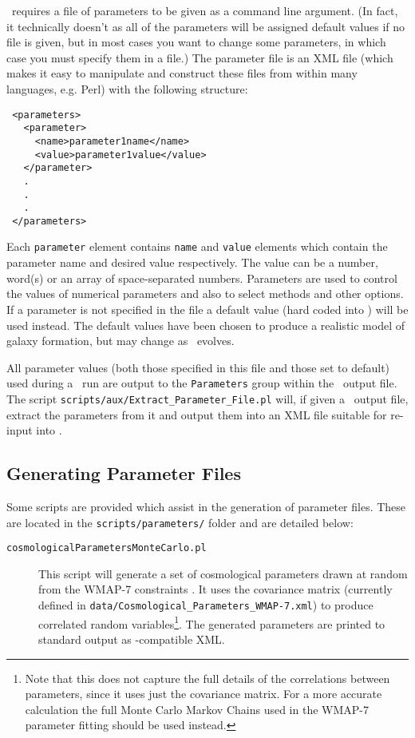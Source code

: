 \glc\ requires a file of parameters to be given as a command line argument. (In fact, it technically doesn't as all of the parameters will be assigned default values if no file is given, but in most cases you want to change some parameters, in which case you must specify them in a file.) The parameter file is an XML file (which makes it easy to manipulate and construct these files from within many languages, e.g. Perl) with the following structure:
\begin{verbatim}
 <parameters>
   <parameter>
     <name>parameter1name</name>
     <value>parameter1value</value>
   </parameter>
   .
   .
   .
 </parameters>
\end{verbatim}
Each {\tt parameter} element contains {\tt name} and {\tt value} elements which contain the parameter name and desired value respectively. The value can be a number, word(s) or an array of space-separated numbers. Parameters are used to control the values of numerical parameters and also to select methods and other options. If a parameter is not specified in the file a default value (hard coded into \glc) will be used instead. The default values have been chosen to produce a realistic model of galaxy formation, but may change as \glc\ evolves.

All parameter values (both those specified in this file and those set to default) used during a \glc\ run are output to the {\tt Parameters} group within the \glc\ output file. The script {\tt scripts/aux/Extract\_Parameter\_File.pl} will, if given a \glc\ output file, extract the parameters from it and output them into an XML file suitable for re-input into \glc.

\subsection{Generating Parameter Files}

Some scripts are provided which assist in the generation of parameter files. These are located in the {\tt scripts/parameters/} folder and are detailed below:
\begin{description}
\item [{\tt cosmologicalParametersMonteCarlo.pl}] This script will generate a set of cosmological parameters drawn at random from the WMAP-7 constraints \cite{komatsu_seven-year_2010}. It uses the covariance matrix (currently defined in {\tt data/Cosmological\_Parameters\_WMAP-7.xml}) to produce correlated random variables\footnote{Note that this does not capture the full details of the correlations between parameters, since it uses just the covariance matrix. For a more accurate calculation the full Monte Carlo Markov Chains used in the WMAP-7 parameter fitting should be used instead.}. The generated parameters are printed to standard output as \glc-compatible XML.
\end{description}

